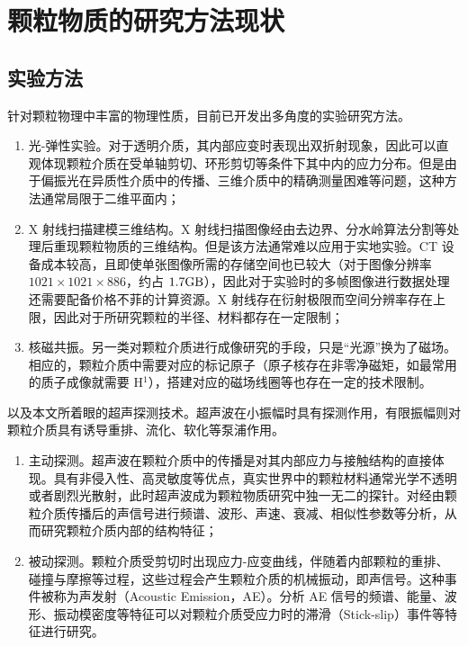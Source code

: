 \section{颗粒物质的研究方法现状}


\subsection{实验方法}

针对颗粒物理中丰富的物理性质，目前已开发出多角度的实验研究方法。

\begin{enumerate}
  \item 光-弹性实验\cite{photoelasticimetry}。对于透明介质，其内部应变时表现出双折射现象，因此可以直观体现颗粒介质在受单轴剪切、环形剪切等条件下其中内的应力分布。但是由于偏振光在异质性介质中的传播、三维介质中的精确测量困难等问题\cite{Non-Destructive_3D_Photoelasticity}，这种方法通常局限于二维平面内；
  \item X 射线扫描建模三维结构\cite{PhysRevE.68.020301}。X 射线扫描图像经由去边界、分水岭算法分割等处理后重现颗粒物质的三维结构。但是该方法通常难以应用于实地实验。CT 设备成本较高，且即使单张图像所需的存储空间也已较大（对于图像分辨率 $1021\times 1021 \times 886$，约占 $1.7\unit{\giga\byte}$），因此对于实验时的多帧图像进行数据处理还需要配备价格不菲的计算资源。X 射线存在衍射极限而空间分辨率存在上限，因此对于所研究颗粒的半径、材料都存在一定限制；
  \item 核磁共振\cite{CLARKE2023}。另一类对颗粒介质进行成像研究的手段，只是“光源”换为了磁场。相应的，颗粒介质中需要对应的标记原子（原子核存在非零净磁矩，如最常用的质子成像就需要 H$^{1}$），搭建对应的磁场线圈等也存在一定的技术限制。
\end{enumerate}

以及本文所着眼的超声探测技术。超声波在小振幅时具有探测作用，有限振幅则对颗粒介质具有诱导重排、流化、软化等泵浦作用。

\begin{enumerate}
  \item 主动探测。超声波在颗粒介质中的传播是对其内部应力与接触结构的直接体现\cite{PhysRevB.48.15646,Jia1999UltrasoundPI,Transitional}。具有非侵入性、高灵敏度等优点，真实世界中的颗粒材料通常光学不透明或者剧烈光散射，此时超声波成为颗粒物质研究中独一无二的探针。对经由颗粒介质传播后的声信号进行频谱、波形、声速、衰减、相似性参数等分析，从而研究颗粒介质内部的结构特征；
  \item 被动探测。颗粒介质受剪切时出现应力-应变曲线，伴随着内部颗粒的重排、碰撞与摩擦等过程，这些过程会产生颗粒介质的机械振动，即声信号。这种事件被称为声发射（Acoustic Emission，AE）。分析 AE 信号的频谱、能量、波形、振动模密度等特征\cite{PhysRevLett.120.218003,10.1029/2023JB026612,doi:10.1073/pnas.2305134120,}可以对颗粒介质受应力时的滞滑（Stick-slip）事件等特征进行研究。
\end{enumerate}


